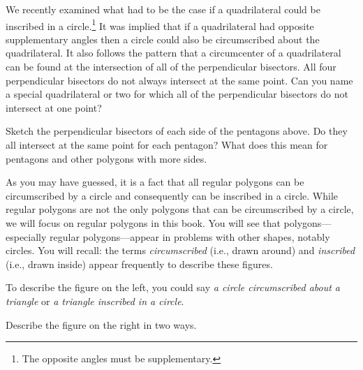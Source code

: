 We recently examined what had to be the case if a quadrilateral could be inscribed in a circle.\footnote{The opposite angles must be supplementary.} It was implied that if a quadrilateral had opposite supplementary angles then a circle could also be circumscribed about the quadrilateral.  It also follows the pattern that a circumcenter of a quadrilateral can be found at the intersection of all of the perpendicular bisectors.  All four perpendicular bisectors do not always intersect at the same point. \q Can you name a special quadrilateral or two for which all of the perpendicular bisectors do not intersect at one point?

\medskip

\noindent \q Sketch the perpendicular bisectors of each side of the pentagons above.  Do they all intersect at the same point for each pentagon?  What does this mean for pentagons and other polygons with more sides.

\medskip
\newpage

As you may have guessed, it is a fact that all regular polygons can be circumscribed by a circle and consequently can be inscribed in a circle.  While regular polygons are not the only polygons that can be circumscribed by a circle, we will focus on regular polygons in this book.  You will see that polygons---especially regular polygons---appear in problems with other shapes, notably circles.  You will recall:  
the terms \emph{circumscribed} (i.e., drawn around) 
and \emph{inscribed} (i.e., drawn inside) appear frequently to describe these figures.

To describe the figure on the left, you could say 
\textit{a circle circumscribed about a triangle} or 
\textit{a triangle inscribed in a circle}.\\

\hspace*{\fill}
\hspace*{\fill}
\hspace*{\fill}

\noindent \q Describe the figure on the right in two ways.

